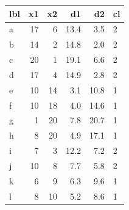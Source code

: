 \documentclass[a4paper]{article}
\begin{document}
\begin{minipage}[t]{0.49\textwidth}
\centering
\begin{Schunk}

\begin{tabular}{lrr>{}r>{}r>{}l}
\toprule
lbl & x1 & x2 & d1 & d2 & cl\\
\midrule
a & 17 & 6 & \textcolor{myblue}{13.4} & \textcolor{myblue}{3.5} & \textcolor{myblue}{2}\\
b & 14 & 2 & \textcolor{myblue}{14.8} & \textcolor{myblue}{2.0} & \textcolor{myblue}{2}\\
c & 20 & 1 & \textcolor{myblue}{19.1} & \textcolor{myblue}{6.6} & \textcolor{myblue}{2}\\
d & 17 & 4 & \textcolor{myblue}{14.9} & \textcolor{myblue}{2.8} & \textcolor{myblue}{2}\\
e & 10 & 14 & \textcolor{myblue}{3.1} & \textcolor{myblue}{10.8} & \textcolor{myblue}{1}\\
\addlinespace
f & 10 & 18 & \textcolor{myblue}{4.0} & \textcolor{myblue}{14.6} & \textcolor{myblue}{1}\\
g & 1 & 20 & \textcolor{myblue}{7.8} & \textcolor{myblue}{20.7} & \textcolor{myblue}{1}\\
h & 8 & 20 & \textcolor{myblue}{4.9} & \textcolor{myblue}{17.1} & \textcolor{myblue}{1}\\
i & 7 & 3 & \textcolor{myblue}{12.2} & \textcolor{myblue}{7.2} & \textcolor{myblue}{2}\\
j & 10 & 8 & \textcolor{myblue}{7.7} & \textcolor{myblue}{5.8} & \textcolor{myblue}{2}\\
\addlinespace
k & 6 & 9 & \textcolor{myblue}{6.3} & \textcolor{myblue}{9.6} & \textcolor{myblue}{1}\\
l & 8 & 10 & \textcolor{myblue}{5.2} & \textcolor{myblue}{8.6} & \textcolor{myblue}{1}\\
\bottomrule
\end{tabular}

\end{Schunk}
\end{minipage}
\end{document}
